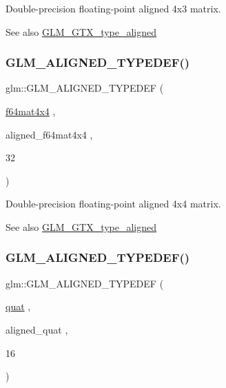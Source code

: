 Double-\/precision floating-\/point aligned 4x3 matrix. \begin{DoxySeeAlso}{See also}
\mbox{\hyperlink{group__gtx__type__aligned}{G\+L\+M\+\_\+\+G\+T\+X\+\_\+type\+\_\+aligned}} 
\end{DoxySeeAlso}
\mbox{\label{group__gtx__type__aligned_ga912a16432608b822f1e13607529934c1}} 
\subsubsection{\texorpdfstring{GLM\_ALIGNED\_TYPEDEF()}{GLM\_ALIGNED\_TYPEDEF()}\hspace{0.1cm}{\footnotesize\ttfamily [204/209]}}
{\footnotesize\ttfamily glm\+::\+G\+L\+M\+\_\+\+A\+L\+I\+G\+N\+E\+D\+\_\+\+T\+Y\+P\+E\+D\+EF (\begin{DoxyParamCaption}\item[{\mbox{\hyperlink{group__gtc__type__precision_ga6b1ada50de2fc7d991138ab857fb2476}{f64mat4x4}}}]{,  }\item[{aligned\+\_\+f64mat4x4}]{,  }\item[{32}]{ }\end{DoxyParamCaption})}

Double-\/precision floating-\/point aligned 4x4 matrix. \begin{DoxySeeAlso}{See also}
\mbox{\hyperlink{group__gtx__type__aligned}{G\+L\+M\+\_\+\+G\+T\+X\+\_\+type\+\_\+aligned}} 
\end{DoxySeeAlso}
\mbox{\label{group__gtx__type__aligned_gafd945a8ea86b042aba410e0560df9a3d}} 
\subsubsection{\texorpdfstring{GLM\_ALIGNED\_TYPEDEF()}{GLM\_ALIGNED\_TYPEDEF()}\hspace{0.1cm}{\footnotesize\ttfamily [205/209]}}
{\footnotesize\ttfamily glm\+::\+G\+L\+M\+\_\+\+A\+L\+I\+G\+N\+E\+D\+\_\+\+T\+Y\+P\+E\+D\+EF (\begin{DoxyParamCaption}\item[{\mbox{\hyperlink{namespaceglm_ac1f6a5957091b849730ea6f05a6b7ad6}{quat}}}]{,  }\item[{aligned\+\_\+quat}]{,  }\item[{16}]{ }\end{DoxyParamCaption})}

